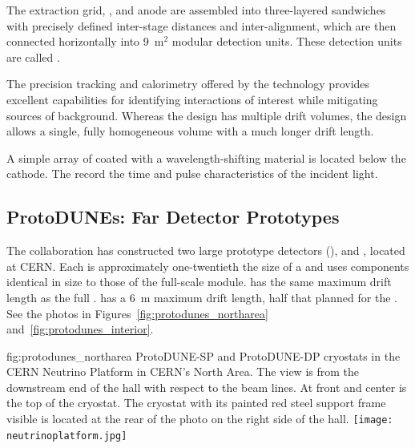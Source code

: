  The extraction grid, , and anode are assembled into three-layered sandwiches with precisely defined inter-stage distances and inter-alignment,  which are then connected horizontally into \num{9}~m$^2$ modular detection units. These detection units are called .

The precision tracking and calorimetry offered by the  technology provides excellent capabilities for identifying interactions of interest while mitigating sources of background.  Whereas the  design has multiple drift volumes, the  design allows a single, fully homogeneous  volume with a much longer drift length.

A simple array of  coated with a wavelength-shifting material is located below the cathode. The  record  the time and pulse characteristics of the incident light.



\FloatBarrier

\subsection{ProtoDUNEs: Far Detector Prototypes}

The  collaboration has constructed 
two large prototype detectors (),  and , located at CERN. %
 Each is approximately one-twentieth the size of a   and uses components identical in size to those of the full-scale module.  has the same \spmaxdrift maximum drift length as the full .  has a \SI{6}{m} maximum drift length, half that planned for the . See the photos in Figures~\ref{fig:protodunes_northarea} and~\ref{fig:protodunes_interior}.

\begin{dunefigure}
{fig:protodunes_northarea}
{ProtoDUNE-SP and ProtoDUNE-DP cryostats in the CERN Neutrino Platform in CERN's North Area.  The view is from the downstream end of the hall with respect to the beam lines.  At front and  center is the top of the  cryostat.  The  cryostat with its painted red steel support frame visible is located at the rear of the photo on the right side of the hall.} 
\texttt{[image: neutrinoplatform.jpg]}
\end{dunefigure}

